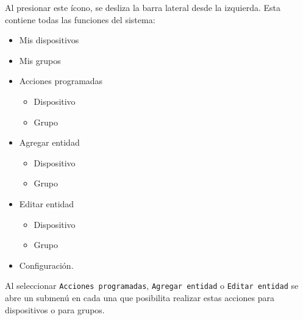 Al presionar este ícono, se desliza la barra lateral desde la izquierda. Esta contiene todas las funciones del sistema: 

\begin{itemize}
  \item Mis dispositivos
  \item Mis grupos
  \item Acciones programadas
    \begin{itemize}
      \item Dispositivo
      \item Grupo
    \end{itemize}
  \item Agregar entidad
    \begin{itemize}
      \item Dispositivo
      \item Grupo
    \end{itemize}
  \item Editar entidad
    \begin{itemize}
      \item Dispositivo
      \item Grupo
    \end{itemize}
  \item Configuración.
\end{itemize}

Al seleccionar \lstinline[columns=fixed]{Acciones programadas}, \lstinline[columns=fixed]{Agregar entidad} o \lstinline[columns=fixed]{Editar entidad} se abre un submenú en cada una que posibilita realizar estas acciones para dispositivos o para grupos.

